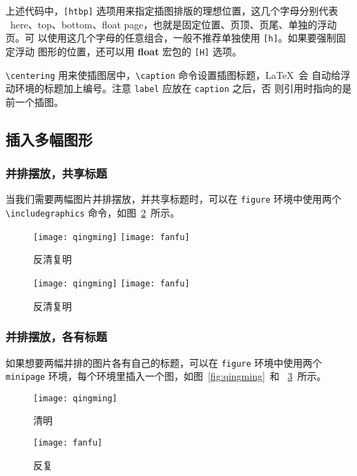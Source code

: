 上述代码中，\verb|[htbp]| 选项用来指定插图排版的理想位置，这几个字母分别代表
~here、top、bottom、float page，也就是固定位置、页顶、页尾、单独的浮动页。可
以使用这几个字母的任意组合，一般不推荐单独使用 \verb|[h]|。如果要强制固定浮动
图形的位置，还可以用 \textbf{float} 宏包的 \verb|[H]| 选项。

\verb|\centering| 用来使插图居中，\verb|\caption| 命令设置插图标题，\LaTeX~会
自动给浮动环境的标题加上编号。注意 \verb|label| 应放在 \verb|caption| 之后，否
则引用时指向的是前一个插图。

\subsection{插入多幅图形}

\subsubsection*{并排摆放，共享标题}

当我们需要两幅图片并排摆放，并共享标题时，可以在 \texttt{figure} 环境中使用两个
\verb|\includegraphics| 命令，如图~\ref{fig:fanqingfuming}~所示。

\begin{code}
\begin{figure}[htbp]
\centering
\texttt{[image: qingming]}
\hspace{36pt}
\texttt{[image: fanfu]}
\caption{反清复明}
\label{fig:fanqingmuming}
\end{figure}
\end{code}

\begin{figure}[htbp]
\centering
\texttt{[image: qingming]}
\hspace{36pt}
\texttt{[image: fanfu]}
\caption{反清复明}
\label{fig:fanqingfuming}
\end{figure}

\subsubsection*{并排摆放，各有标题}

如果想要两幅并排的图片各有自己的标题，可以在 \texttt{figure} 环境中使用两个
 \texttt{minipage} 环境，每个环境里插入一个图，如图~\ref{fig:qingming}~和
~\ref{fig:fanfu}~所示。

\begin{code}
\begin{figure}[htbp]
\centering
\begin{minipage}[t]{0.3\textwidth}
    \centering
    \texttt{[image: qingming]}
    \caption{清明}
    \label{fig:qingming}
\end{minipage}
\hspace{36pt}
\begin{minipage}[t]{0.3\textwidth}
    \centering
    \texttt{[image: fanfu]}
    \caption{反复}
    \label{fig:fanfu}
\end{minipage}
\end{figure}
\end{code}


